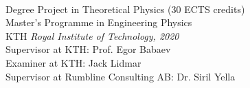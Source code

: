 \begin{titlepage}
    
    ~\\

    \vspace*{\fill}

    \begin{flushleft}
    \noindent
    Degree Project in Theoretical Physics (30 ECTS credits)\\
    Master's Programme in Engineering Physics\\
    KTH \textit{Royal Institute of Technology, 2020}\\
    Supervisor at KTH: Prof. Egor Babaev\\
    Examiner at KTH: Jack Lidmar\\
    Supervisor at Rumbline Consulting AB: Dr. Siril Yella
    \end{flushleft}
    
\end{titlepage}